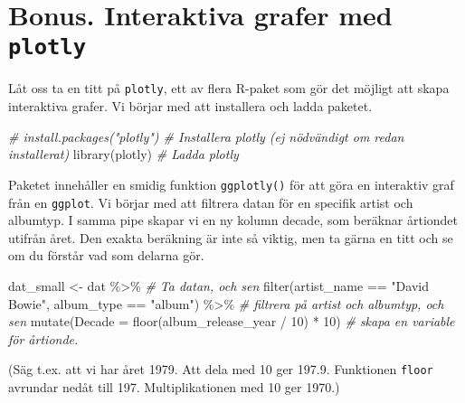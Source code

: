 \documentclass[
]{book}
\newenvironment{Shaded}{\begin{snugshade}}{\end{snugshade}}
\newcommand{\AttributeTok}[1]{\textcolor[rgb]{0.77,0.63,0.00}{#1}}
\newcommand{\CommentTok}[1]{\textcolor[rgb]{0.56,0.35,0.01}{\textit{#1}}}
\newcommand{\DecValTok}[1]{\textcolor[rgb]{0.00,0.00,0.81}{#1}}
\newcommand{\FunctionTok}[1]{\textcolor[rgb]{0.00,0.00,0.00}{#1}}
\newcommand{\NormalTok}[1]{#1}
\newcommand{\OtherTok}[1]{\textcolor[rgb]{0.56,0.35,0.01}{#1}}
\newcommand{\SpecialCharTok}[1]{\textcolor[rgb]{0.00,0.00,0.00}{#1}}
\newcommand{\StringTok}[1]{\textcolor[rgb]{0.31,0.60,0.02}{#1}}
\theoremstyle{definition}
\theoremstyle{definition}
\theoremstyle{definition}
\theoremstyle{definition}
\theoremstyle{remark}
\begin{document}
\hypertarget{bonus.-interaktiva-grafer-med-plotly}{%
\section{\texorpdfstring{Bonus. Interaktiva grafer med \texttt{plotly}}{Bonus. Interaktiva grafer med plotly}}\label{bonus.-interaktiva-grafer-med-plotly}}

Låt oss ta en titt på \texttt{plotly}, ett av flera R-paket som gör det möjligt att skapa interaktiva grafer. Vi börjar med att installera och ladda paketet.

\begin{Shaded}
\begin{Highlighting}[]
\CommentTok{\# install.packages("plotly")                     \# Installera plotly (ej nödvändigt om redan installerat)}
\FunctionTok{library}\NormalTok{(plotly)                                  }\CommentTok{\# Ladda plotly}
\end{Highlighting}
\end{Shaded}

Paketet innehåller en smidig funktion \texttt{ggplotly()} för att göra en interaktiv graf från en \texttt{ggplot}. Vi börjar med att filtrera datan för en specifik artist och albumtyp. I samma pipe skapar vi en ny kolumn decade, som beräknar årtiondet utifrån året. Den exakta beräkning är inte så viktig, men ta gärna en titt och se om du förstår vad som delarna gör.

\begin{Shaded}
\begin{Highlighting}[]
\NormalTok{dat\_small }\OtherTok{\textless{}{-}}\NormalTok{ dat }\SpecialCharTok{\%\textgreater{}\%}                                                 \CommentTok{\# Ta datan, och sen}
  \FunctionTok{filter}\NormalTok{(artist\_name }\SpecialCharTok{==} \StringTok{"David Bowie"}\NormalTok{, album\_type }\SpecialCharTok{==} \StringTok{"album"}\NormalTok{) }\SpecialCharTok{\%\textgreater{}\%}    \CommentTok{\# filtrera på artist och albumtyp, och sen}
  \FunctionTok{mutate}\NormalTok{(}\AttributeTok{Decade =} \FunctionTok{floor}\NormalTok{(album\_release\_year }\SpecialCharTok{/} \DecValTok{10}\NormalTok{) }\SpecialCharTok{*} \DecValTok{10}\NormalTok{)               }\CommentTok{\# skapa en variable för årtionde.}
\end{Highlighting}
\end{Shaded}

(Säg t.ex. att vi har året 1979. Att dela med 10 ger 197.9. Funktionen \texttt{floor} avrundar nedåt till 197. Multiplikationen med 10 ger 1970.)
\end{document}
